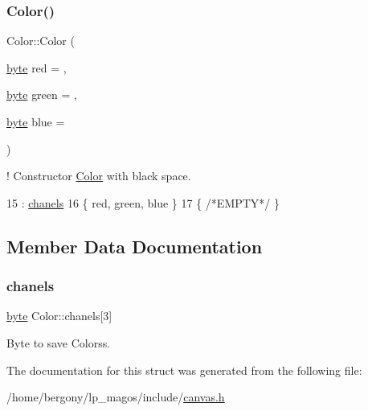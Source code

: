 \subsubsection{\texorpdfstring{Color()}{Color()}}
{\footnotesize\ttfamily Color\+::\+Color (\begin{DoxyParamCaption}\item[{\hyperlink{canvas_8h_a0c8186d9b9b7880309c27230bbb5e69d}{byte}}]{red = {},  }\item[{\hyperlink{canvas_8h_a0c8186d9b9b7880309c27230bbb5e69d}{byte}}]{green = {},  }\item[{\hyperlink{canvas_8h_a0c8186d9b9b7880309c27230bbb5e69d}{byte}}]{blue = {} }\end{DoxyParamCaption})\hspace{0.3cm}{\ttfamily [inline]}}



! Constructor \hyperlink{structColor}{Color} with black space. 


\begin{DoxyCode}
15                                                           : \hyperlink{structColor_ada1526285d388ff4b13e1af8d7e3ad44}{chanels}
16     \{ red,          green,           blue \}
17     \{ \textcolor{comment}{/*EMPTY*/} \}
\end{DoxyCode}


\subsection{Member Data Documentation}
\mbox{\label{structColor_ada1526285d388ff4b13e1af8d7e3ad44}} 
\subsubsection{\texorpdfstring{chanels}{chanels}}
{\footnotesize\ttfamily \hyperlink{canvas_8h_a0c8186d9b9b7880309c27230bbb5e69d}{byte} Color\+::chanels\mbox{[}3\mbox{]}}



Byte to save Colorss. 



The documentation for this struct was generated from the following file\+:\begin{DoxyCompactItemize}
\item 
/home/bergony/lp\+\_\+magos/include/\hyperlink{canvas_8h}{canvas.\+h}\end{DoxyCompactItemize}
